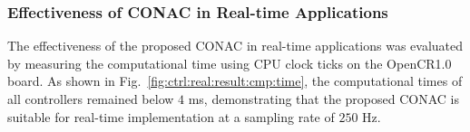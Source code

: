 \documentclass[letterpaper, journal]{IEEEtran}
\begin{document}



\hfill

\subsubsection{Effectiveness of CONAC in Real-time Applications}

The effectiveness of the proposed CONAC in real-time applications was evaluated by measuring the computational time using CPU clock ticks on the OpenCR1.0 board. 
As shown in Fig.~\ref{fig:ctrl:real:result:cmp:time}, the computational times of all controllers remained below $4$ ms, demonstrating that the proposed CONAC is suitable for real-time implementation at a sampling rate of $250$ Hz.
\end{document}
